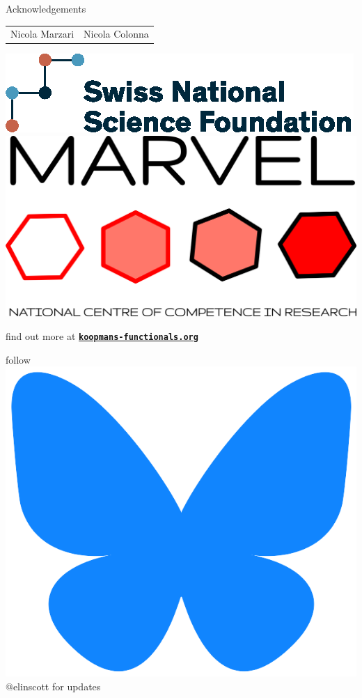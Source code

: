 \documentclass[xcolor=table,aspectratio=169]{beamer}
\numberwithin{equation}{section}
\begin{document}
\begin{frame}{Acknowledgements}
\begin{center}
\begin{tabularx}{0.5\textwidth}{CC}
         Nicola Marzari                                                          &
         Nicola Colonna                                                          
      \end{tabularx}
   \end{center}
   \begin{center}
      \includegraphics[height = 0.15\paperheight]{logos/snf_color.eps}
      \hspace{3em}
      \includegraphics[height = 0.15\paperheight]{logos/marvel_color_on_white_trimmed.png}
   \end{center}

   \vspace{1ex}

   \begin{center}
      find out more at \textbf{\texttt{\href{https://koopmans-functionals.org/en/latest/}{koopmans-functionals.org}}}

      \vspace{1em}
      follow \includegraphics[height=\fontcharht\font`\B]{logos/bluesky.png} \textcolor{bluesky}{@elinscott} for updates
      

\end{center}
\end{frame}
\end{document}
